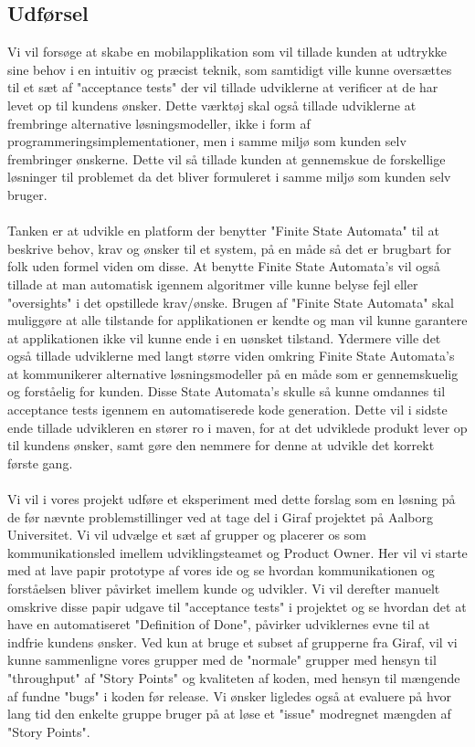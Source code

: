 \subsection{Udførsel}
Vi vil forsøge at skabe en mobilapplikation som vil tillade kunden at udtrykke sine behov i en intuitiv og præcist teknik, som samtidigt ville kunne oversættes til et sæt af "acceptance tests" der vil tillade udviklerne at verificer at de har levet op til kundens ønsker.
Dette værktøj skal også tillade udviklerne at frembringe alternative løsningsmodeller, ikke i form af programmeringsimplementationer, men i samme miljø som kunden selv frembringer ønskerne.
Dette vil så tillade kunden at gennemskue de forskellige løsninger til problemet da det bliver formuleret i samme miljø som kunden selv bruger.
\\\\
Tanken er at udvikle en platform der benytter "Finite State Automata" til at beskrive behov, krav og ønsker til et system, på en måde så det er brugbart for folk uden formel viden om disse.
At benytte Finite State Automata's vil også tillade at man automatisk igennem algoritmer ville kunne belyse fejl eller "oversights" i det opstillede krav/ønske.
Brugen af "Finite State Automata" skal muliggøre at alle tilstande for applikationen er kendte og man vil kunne garantere at applikationen ikke vil kunne ende i en uønsket tilstand.
Ydermere ville det også tillade udviklerne med langt større viden omkring Finite State Automata's at kommunikerer alternative løsningsmodeller på en måde som er gennemskuelig og forståelig for kunden.
Disse State Automata's skulle så kunne omdannes til acceptance tests igennem en automatiserede kode generation.
Dette vil i sidste ende tillade udvikleren en stører ro i maven, for at det udviklede produkt lever op til kundens ønsker, samt gøre den nemmere for denne at udvikle det korrekt første gang.
\\\\
Vi vil i vores projekt udføre et eksperiment med dette forslag som en løsning på de før nævnte problemstillinger ved at tage del i Giraf projektet på Aalborg Universitet.
Vi vil udvælge et sæt af grupper og placerer os som kommunikationsled imellem udviklingsteamet og Product Owner.
Her vil vi starte med at lave papir prototype af vores ide og se hvordan kommunikationen og forståelsen bliver påvirket imellem kunde og udvikler.
Vi vil derefter manuelt omskrive disse papir udgave til "acceptance tests" i projektet og se hvordan det at have en automatiseret "Definition of Done", påvirker udviklernes evne til at indfrie kundens ønsker.
Ved kun at bruge et subset af grupperne fra Giraf, vil vi kunne sammenligne vores grupper med de "normale" grupper med hensyn til "throughput" af "Story Points" og kvaliteten af koden, med hensyn til mængende af fundne "bugs" i koden før release.
Vi ønsker ligledes også at evaluere på hvor lang tid den enkelte gruppe bruger på at løse et "issue" modregnet mængden af "Story Points".

